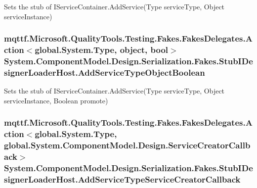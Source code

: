 Sets the stub of I\-Service\-Container.\-Add\-Service(\-Type service\-Type, Object service\-Instance)

\hypertarget{class_system_1_1_component_model_1_1_design_1_1_serialization_1_1_fakes_1_1_stub_i_designer_loader_host_aa42e2e725359e609ac35fc41ee775349}{
\subsubsection[{Add\-Service\-Type\-Object\-Boolean}]{\setlength{\rightskip}{0pt plus 5cm}mqttf.\-Microsoft.\-Quality\-Tools.\-Testing.\-Fakes.\-Fakes\-Delegates.\-Action$<$global.\-System.\-Type, object, bool$>$ System.\-Component\-Model.\-Design.\-Serialization.\-Fakes.\-Stub\-I\-Designer\-Loader\-Host.\-Add\-Service\-Type\-Object\-Boolean}}\label{class_system_1_1_component_model_1_1_design_1_1_serialization_1_1_fakes_1_1_stub_i_designer_loader_host_aa42e2e725359e609ac35fc41ee775349}


Sets the stub of I\-Service\-Container.\-Add\-Service(\-Type service\-Type, Object service\-Instance, Boolean promote)

\hypertarget{class_system_1_1_component_model_1_1_design_1_1_serialization_1_1_fakes_1_1_stub_i_designer_loader_host_a60745d399479efc237ab18d28e497fe0}{
\subsubsection[{Add\-Service\-Type\-Service\-Creator\-Callback}]{\setlength{\rightskip}{0pt plus 5cm}mqttf.\-Microsoft.\-Quality\-Tools.\-Testing.\-Fakes.\-Fakes\-Delegates.\-Action$<$global.\-System.\-Type, global.\-System.\-Component\-Model.\-Design.\-Service\-Creator\-Callback$>$ System.\-Component\-Model.\-Design.\-Serialization.\-Fakes.\-Stub\-I\-Designer\-Loader\-Host.\-Add\-Service\-Type\-Service\-Creator\-Callback}}\label{class_system_1_1_component_model_1_1_design_1_1_serialization_1_1_fakes_1_1_stub_i_designer_loader_host_a60745d399479efc237ab18d28e497fe0}


